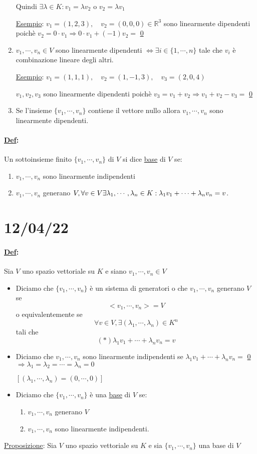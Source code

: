 \documentclass{article}
\newcommand{\ul}[1]{\underline{#1}}
\newcommand{\R}{\mathbb{R}}
\newcommand{\Def}[2]{\paragraph{\ul{Def}:}#1\\\hspace*{3em}\begin{minipage}{.8\textwidth}#2\end{minipage}}
\begin{document}
\begin{enumerate}
	  Quindi $\exists\lambda\in K:v_1=\lambda v_2$ o $v_2=\lambda v_1$

	  \ul{Esempio}: $v_1=(1,2,3),\quad v_2=(0,0,0)\in\R^3$ sono linearmente dipendenti poichè $v_2=0\cdot v_1\Rightarrow0\cdot v_1+(-1)v_2=$ \ul{0}
	\item $v_1,\cdots,v_n\in V$ sono linearmente dipendenti $\Leftrightarrow\exists i\in\{1,\cdots,n\}$ tale che $v_i$ è combinazione lineare degli altri.

	  \ul{Esempio}: $v_1=(1,1,1),\quad v_2=(1,-1,3),\quad v_3=(2,0,4)$

	  $v_1,v_2,v_3$ sono linearmente dipendenti poichè $v_3=v_1+v_2\Rightarrow v_1+v_2-v_3=$ \ul{0}
	\item Se l'insieme $\{v_1,\cdots,v_n\}$ contiene il vettore nullo allora $v_1,\cdots,v_n$ sono linearmente dipendenti.
\end{enumerate}

\Def{Un sottoinsieme finito $\{v_1,\cdots,v_n\}$ di $V$ si dice \ul{base} di $V$ se:}{
	\begin{enumerate}
		\item $v_1,\cdots,v_n$ sono linearmente indipendenti
		\item $v_1,\cdots,v_n$ generano $V,\forall v\in V\\\exists\lambda_1,\cdots,\lambda_n\in K:\lambda_1v_1+\cdots+\lambda_nv_n=v$.
	\end{enumerate}
}
\section{12/04/22}

\Def{Sia $V$ uno spazio vettoriale su $K$ e siano $v_1,\cdots,v_n\in V$}{
	\begin{itemize}
		\item Diciamo che $\{v_1,\cdots,v_n\}$ è un sistema di generatori o che $v_1,\cdots,v_n$ generano $V$ se
		  $$<v_1,\cdots,v_n>=V$$
		  o equivalentemente se
		  $$\forall v\in V,\exists(\lambda_1,\cdots,\lambda_n)\in K^n$$
		  tali che
		  $$(*)\lambda_1v_1+\cdots+\lambda_nv_n=v$$
		\item Diciamo che $v_1,\cdots,v_n$ sono linearmente indipendenti se $\lambda_1v_1+\cdots+\lambda_nv_n=$ \ul{0} $\Rightarrow\lambda_1=\lambda_2=\cdots=\lambda_n=0$

		  $[(\lambda_1,\cdots,\lambda_n)=(0,\cdots,0)]$

		\item Diciamo che $\{v_1,\cdots,v_n\}$ è una \ul{base} di $V$ se:
		  \begin{enumerate}
			  \item $v_1,\cdots,v_n$ generano $V$
			  \item $v_1,\cdots,v_n$ sono linearmente indipendenti.
		  \end{enumerate}
	\end{itemize}
}
\ul{Proposizione}: Sia $V$ uno spazio vettoriale su $K$ e sia $\{v_1,\cdots,v_n\}$ una base di $V$
\end{document}
